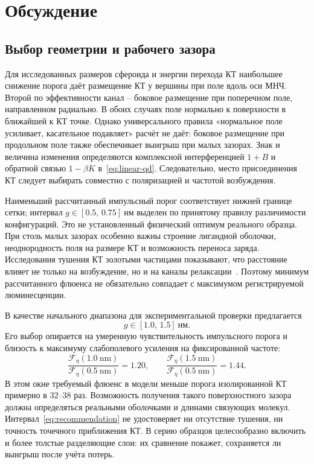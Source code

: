 \section{Обсуждение}
\label{sec:discussion}

\subsection{Выбор геометрии и рабочего зазора}
\label{sec:disc-recommendation}
\label{sec:disc-geometry}

Для исследованных размеров сфероида и энергии перехода КТ наибольшее
снижение порога даёт размещение КТ у вершины при поле вдоль оси МНЧ.
Второй по эффективности канал -- боковое размещение при поперечном поле,
направленном радиально. В обоих случаях поле нормально к поверхности
в ближайшей к КТ точке. Однако универсального правила «нормальное поле
усиливает, касательное подавляет» расчёт не даёт: боковое размещение
при продольном поле также обеспечивает выигрыш при малых зазорах.
Знак и величина изменения определяются комплексной интерференцией
$1+B$ и обратной связью $1-\beta K$ в~\eqref{eq:linear-qd}.
Следовательно, место присоединения КТ следует выбирать совместно
с поляризацией и частотой возбуждения.

Наименьший рассчитанный импульсный порог соответствует нижней границе
сетки; интервал $g\in[0.5,\,0.75]\ \text{нм}$ выделен по принятому правилу
различимости конфигураций. Это не установленный физический оптимум
реального образца. При столь малых зазорах особенно важны строение
лигандной оболочки, неоднородность поля на размере КТ и возможность
переноса заряда. Исследования тушения КТ золотыми частицами показывают,
что расстояние влияет не только на возбуждение, но и на каналы
релаксации~\cite{pons2007}. Поэтому минимум рассчитанного флюенса
не обязательно совпадает с максимумом регистрируемой люминесценции.

В качестве начального диапазона для экспериментальной проверки
предлагается
\begin{equation}
  g\in[1.0,\,1.5]\ \text{нм}.
  \label{eq:recommendation}
\end{equation}
Его выбор опирается на умеренную чувствительность импульсного порога
и близость к максимуму слабополевого усиления на фиксированной частоте:
\begin{equation}
  \frac{\mathcal F_\eta(\SI{1.0}{\nano\meter})}
       {\mathcal F_\eta(\SI{0.5}{\nano\meter})}=1.20,
  \qquad
  \frac{\mathcal F_\eta(\SI{1.5}{\nano\meter})}
       {\mathcal F_\eta(\SI{0.5}{\nano\meter})}=1.44.
  \label{eq:step-back-cost}
\end{equation}
В этом окне требуемый флюенс в модели меньше порога изолированной КТ
примерно в $32$--$38$ раз. Возможность получения такого поверхностного
зазора должна определяться реальными оболочками и длинами связующих
молекул. Интервал~\eqref{eq:recommendation} не удостоверяет ни отсутствие
тушения, ни точность точечного приближения КТ. В серию образцов целесообразно
включить и более толстые разделяющие слои: их сравнение покажет, сохраняется
ли выигрыш после учёта потерь.

